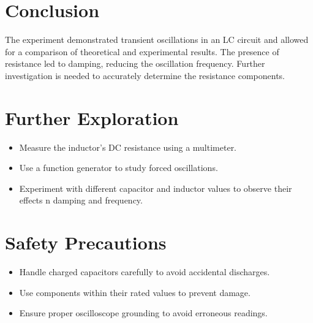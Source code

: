 \documentclass[a4paper,12pt]{article}
\begin{document}
\section{Conclusion}
The experiment demonstrated transient oscillations in an LC circuit and allowed for a comparison of theoretical and experimental results. The presence of resistance led to damping, reducing the oscillation frequency. Further investigation is needed to accurately determine the resistance components.

\section{Further Exploration}
\begin{itemize}
    \item Measure the inductor's DC resistance using a multimeter.
    \item Use a function generator to study forced oscillations.
    \item Experiment with different capacitor and inductor values to observe their effects n damping and frequency.
\end{itemize}

\section{Safety Precautions}
\begin{itemize}
    \item Handle charged capacitors carefully to avoid accidental discharges.
    \item Use components within their rated values to prevent damage.
    \item Ensure proper oscilloscope grounding to avoid erroneous readings.
\end{itemize}
\end{document}
